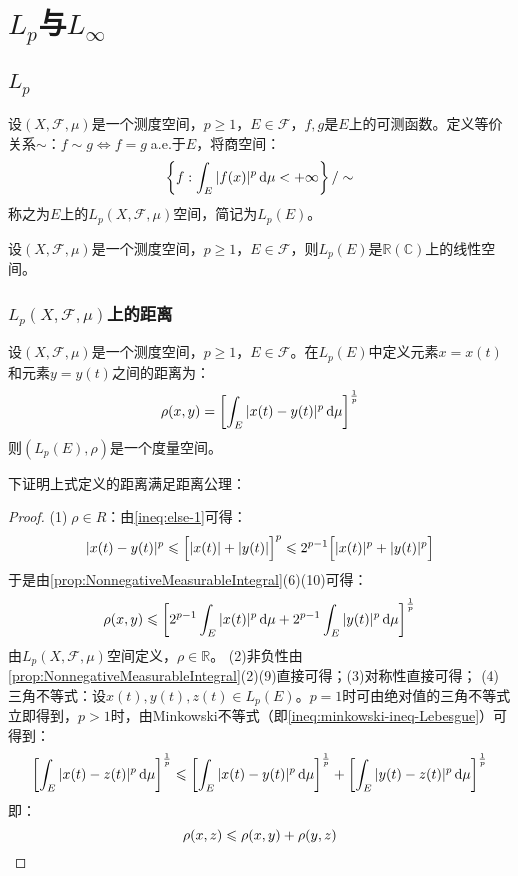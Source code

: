 \section{$L_p$与$L_{\infty}$}

\subsection{$L_p$}
\begin{definition}
	设$(X,\mathscr{F},\mu)$是一个测度空间，$p\geqslant1$，$E\in\mathscr{F}$，$f,g$是$E$上的可测函数。定义等价关系$\sim$：$f\sim g\Leftrightarrow f=g\;$a.e.于$E$，将商空间：
	\begin{equation*}
		\left\{f:\int_{E}|f(x)|^p\mathop{}\!\mathrm{d}\mu<+\infty\right\}/\sim
	\end{equation*}
	称之为$E$上的$L_p(X,\mathscr{F},\mu)$空间，简记为$L_p(E)$。
\end{definition}
\begin{property}\label{prop:Lp}
	设$(X,\mathscr{F},\mu)$是一个测度空间，$p\geqslant1$，$E\in\mathscr{F}$，则$L_p(E)$是$\mathbb{R}(\mathbb{C})$上的线性空间。
\end{property}
\subsubsection{$L_p(X,\mathscr{F},\mu)$上的距离}
\begin{definition}
	设$(X,\mathscr{F},\mu)$是一个测度空间，$p\geqslant1$，$E\in\mathscr{F}$。在$L_p(E)$中定义元素$x=x(t)$和元素$y=y(t)$之间的距离为：
	\begin{equation*}
		\rho(x,y)=\left[\int_{E}|x(t)-y(t)|^p\mathop{}\!\mathrm{d}\mu\right]^\frac{1}{p}
	\end{equation*}
	则$(L_p(E),\rho)$是一个度量空间。
\end{definition}
下证明上式定义的距离满足距离公理：
\begin{proof}
	(1)$\;\rho\in R$：由\cref{ineq:else-1}可得：
	\begin{equation*}
		|x(t)-y(t)|^p\leqslant\Bigl[|x(t)|+|y(t)|\Bigr]^p\leqslant2^{p-1}\Bigl[|x(t)|^p+|y(t)|^p\Bigr]
	\end{equation*}
	于是由\cref{prop:NonnegativeMeasurableIntegral}(6)(10)可得：
	\begin{equation*}
		\rho(x,y)\leqslant\left[2^{p-1}\int_{E}|x(t)|^p\mathop{}\!\mathrm{d}\mu+2^{p-1}\int_{E}|y(t)|^p\mathop{}\!\mathrm{d}\mu\right]^{\frac{1}{p}}
	\end{equation*}
	由$L_p(X,\mathscr{F},\mu)$空间定义，$\rho\in\mathbb{R}$。
	(2)非负性由\cref{prop:NonnegativeMeasurableIntegral}(2)(9)直接可得；(3)对称性直接可得；
	(4)三角不等式：设$x(t),y(t),z(t)\in L_p(E)$。$p=1$时可由绝对值的三角不等式立即得到，$p>1$时，由Minkowski不等式（即\cref{ineq:minkowski-ineq-Lebesgue}）可得到：
	\begin{equation*}
		\left[\int_{E}|x(t)-z(t)|^p\mathop{}\!\mathrm{d}\mu\right]^{\frac{1}{p}} \leqslant \left[\int_{E}|x(t)-y(t)|^p\mathop{}\!\mathrm{d}\mu\right]^{\frac{1}{p}} + \left[\int_{E}|y(t)-z(t)|^p\mathop{}\!\mathrm{d}\mu\right]^{\frac{1}{p}}
	\end{equation*}
	即：
	\begin{equation*}
		\rho(x,z)\leqslant\rho(x,y)+\rho(y,z)\qedhere
	\end{equation*}
\end{proof}
